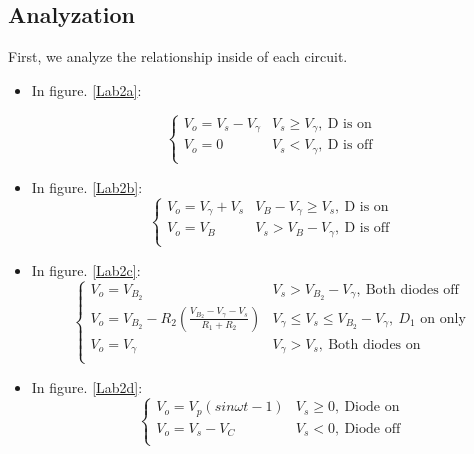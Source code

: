     \subsection{Analyzation}
    First, we analyze the relationship inside of each circuit.\par
    \begin{itemize}
        \item In figure. \ref{Lab2a}:\par
        \begin{equation}
            \begin{cases}
                V_o = V_s - V_\gamma & V_s \ge V_\gamma,~\text{D is on}\\
                V_o = 0 & V_s < V_\gamma,~\text{D is off}\\
            \end{cases}
        \label{l2eq1}
        \end{equation}
        
        \item In figure. \ref{Lab2b}:
        \begin{equation}
            \begin{cases}
                V_o = V_\gamma + V_s & V_B - V_\gamma \ge V_s,~\text{D is on}\\
                V_o = V_B & V_s > V_B - V_\gamma,~\text{D is off}\\
            \end{cases}
        \label{l2eq2}
        \end{equation}
            
        \item In figure. \ref{Lab2c}:
        \begin{equation}
            \begin{cases}
                V_o = V_{B_2} & V_s > V_{B_2} - V_\gamma,~\text{Both diodes off}\\
                V_o = V_{B_2} - R_2(\frac{V_{B_2}-V_\gamma-V_s}{R_1+R_2}) & V_\gamma \le V_s \le V_{B_2} - V_\gamma,~\text{$D_1$ on only}\\
                V_o = V_\gamma & V_\gamma > V_s,~\text{Both diodes on}\\
            \end{cases}
        \label{l2eq3}
        \end{equation}
            
        \item In figure. \ref{Lab2d}:
        \begin{equation}
            \begin{cases}
                V_o = V_p(sin\omega t-1) & V_s \ge 0,~\text{Diode on}\\
                V_o = V_s - V_C & V_s < 0,~\text{Diode off}\\
            \end{cases}
        \label{l2eq4}
        \end{equation}
    \end{itemize}
    \FloatBarrier

